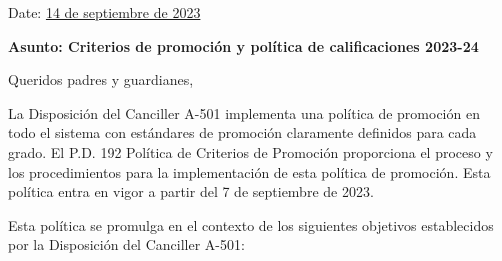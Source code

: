 \documentclass[12pt,letterpaper]{article}
\begin{document}
\vspace*{0.5in}
Date: \href{https://www.ps192.org/apps/bbmessages/show_bbm.jsp?REC_ID=139439}{14 de septiembre de 2023} 

\textbf{Asunto: Criterios de promoción y política de calificaciones 2023-24}

Queridos padres y guardianes,

La Disposición del Canciller A-501 implementa una política de promoción en todo el sistema con estándares de promoción claramente definidos para cada grado. El P.D. 192 Política de Criterios de Promoción proporciona el proceso y los procedimientos para la implementación de esta política de promoción. Esta política entra en vigor a partir del 7 de septiembre de 2023. 

Esta política se promulga en el contexto de los siguientes objetivos establecidos por la Disposición del Canciller A-501:
\end{document}
